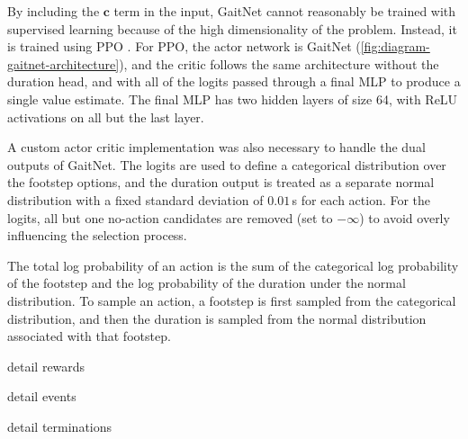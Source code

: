 By including the $\mathbf c$ term in the input, GaitNet cannot reasonably
be trained with supervised learning because of the high
dimensionality of the problem. Instead, it is trained
using PPO \cite{todo}. For PPO, the actor network is GaitNet
(\autoref{fig:diagram-gaitnet-architecture}),
and the critic follows the same architecture without the duration head,
and with all of the logits passed through a final MLP to produce a single
value estimate. The final MLP has two hidden layers of size 64, with
ReLU activations on all but the last layer.

A custom actor critic implementation was also necessary to handle the
dual outputs of GaitNet. The logits are used to define a categorical
distribution over the footstep options, and the duration output is
treated as a separate normal distribution with a fixed standard deviation
of $0.01$\,s for each action. For the logits, all but one no-action candidates
are removed (set to $-\infty$) to avoid overly influencing the
selection process.

The total log probability of an action is the sum of
the categorical log probability of the footstep and the
log probability of the duration under the normal distribution.
To sample an action, a footstep is first sampled from the categorical
distribution, and then the duration is sampled from the normal
distribution associated with that footstep.

\begin{todo}
  detail rewards
\end{todo}

\begin{todo}
  detail events
\end{todo}

\begin{todo}
  detail terminations
\end{todo}
